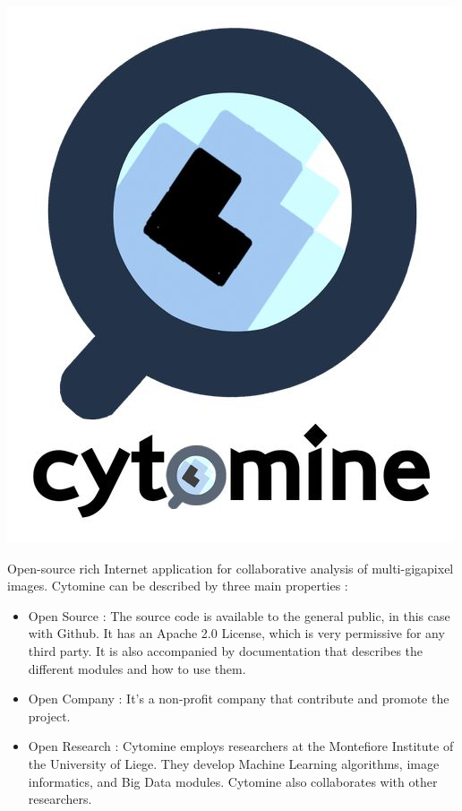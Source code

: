 \documentclass[a4paper,11pt]{report}
\numberwithin{figure}{section} %
\begin{document}
\begin{center}
    \includegraphics[scale=0.80]{logo_cytomine.jpg}
\end{center}

Open-source rich Internet application for collaborative analysis of multi-gigapixel images.
Cytomine can be described by three main properties :
\begin{itemize}
\item[\textbullet] Open Source : The source code is available to the general public, in this case with Github.
It has an Apache 2.0 License, which is very permissive for any third party.
It is also accompanied by documentation that describes the different modules and how to use them.
\item[\textbullet] Open Company : It's a non-profit company that contribute and promote the project.
\item[\textbullet] Open Research : Cytomine employs researchers at the Montefiore Institute of the University of Liege.
They develop Machine Learning algorithms, image informatics, and Big Data modules.
Cytomine also collaborates with other researchers.
\end{itemize}
\end{document}
